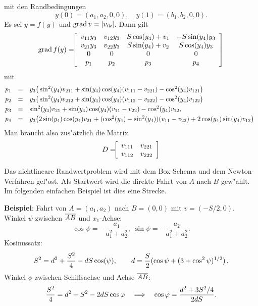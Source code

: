 \documentclass[12pt,a4paper,twoside,leqno]{article}
\begin{document}
mit den Randbedingungen
\[
y(0) = (a_1,a_2,0,0), \quad y(1) = (b_1,b_2,0,0).
\]
Es sei $\dot{y} = f(y)$ und $\grad v = [v_{ik}]$. Dann gilt
\[
\grad f(y) = \ba{[}{cccc}
v_{11}y_3 & v_{12}y_3 & S\cos(y_4) + v_1& - S \sin(y_4)y_3\\
v_{21}y_3 & v_{22}y_3 & S\sin(y_4) + v_2&  S \cos(y_4)y_3\\
0 & 0 & 0 & 0\\
p_1 & p_2 & p_3 & p_4
\ea{]}
\]
mit
\[
\ba{.}{rcl}
p_1 &=& y_3\big(\sin^2(y_4)v_{211} + \sin(y_4)\cos(y_4)(v_{111} - v_{221})
- \cos^2(y_4)v_{121}\big)\\[1mm]
p_2 &=& y_3\big(\sin^2(y_4)v_{212} + \sin(y_4)\cos(y_4)(v_{112} - v_{222})
- \cos^2(y_4)v_{122}\big)\\[1mm]
p_3 &=& \sin^2(y_4)v_{21} + \sin(y_4)\cos(y_4)
(v_{11} - v_{22}) - \cos^2(y_4)v_{12},\\[1mm]
p_4 &=& y_3\big(2\sin(y_4)\cos(y_4)v_{21} + (\cos^2(y_4) - \sin^2(y_4))(v_{11}
- v_{22}) + 2\cos(y_4)\sin(y_4)v_{12}\big)
\ea{.}
\]
Man braucht also zus"atzlich die Matrix
\[
D = \ba{[}{cc} v_{111}  & v_{221}\\ v_{112} & v_{222}\ea{]}
\]
\par
Das nichtlineare Randwertproblem wird mit dem Box-Schema und dem
{\sc Newton}-Verfahren gel"ost. Als Startwert wird die direkte Fahrt von $A$
nach $B$ gew"ahlt. Im folgenden einfachen Beispiel ist dies eine Strecke.

{\bf Beispiel}: Fahrt  von $A = (a_1,a_2)$ nach $B = (0,0)$ mit $v = (- S/2,0)$.
Winkel $\psi$ zwischen $\ol{AB}$ und $x_1$-Achse:
\[
\cos \psi = - \frac{a_1}{a^2_1 + a^2_2}, \;
\sin \psi = - \frac{a_2}{a^2_1 + a^2_2}.
\]
Kosinussatz:
\[
S^2 =  d^2 + \frac{S^2}{4} - dS \cos(\psi), \qquad
d = \dis \frac{S}{2}(\cos \psi + (3 + \cos^2  \psi)^{1/2})\,.
\]
Winkel $\phi $ zwischen Schiffsachse und Achse $\ol{AB}$:
\[
\frac{S^2}{4} = d^2 + S^2 - 2dS \cos \phi
\quad \Longrightarrow \quad
\cos \phi  = \dis \frac{d^2 + 3S^2/4}{2dS}.
\]
\end{document}
